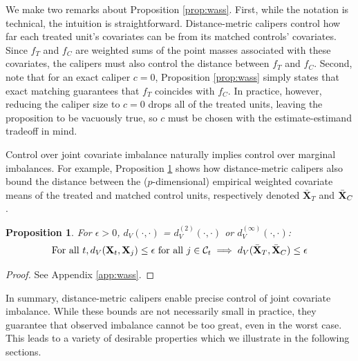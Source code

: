 \documentclass{article}
\newtheorem{proposition}[theorem]{Proposition}
\newcommand{\bX}{\mathbf{X}}
\newcommand{\Xt}{\mathbf{X}_t}
\newcommand{\Xj}{\mathbf{X}_j}
\newcommand{\Ct}{\mathcal{C}_{t}}
\begin{document}
We make two remarks about Proposition \ref{prop:wass}.
First, while the notation is technical, the intuition is straightforward.
Distance-metric calipers control how far each treated unit's covariates can be from its matched controls' covariates.
Since $f_T$ and $f_C$ are weighted sums of the point masses associated with these covariates, the calipers must also control the distance between $f_T$ and $f_C$.
Second, note that for an exact caliper $c=0$, Proposition \ref{prop:wass} simply states that exact matching guarantees that $f_T$ coincides with $f_C$.
In practice, however, reducing the caliper size to $c=0$ drops all of the treated units, leaving the proposition to be vacuously true, so $c$ must be chosen with the estimate-estimand tradeoff in mind.

Control over joint covariate imbalance naturally implies control over marginal imbalances.
For example, Proposition \ref{prop:meanbd} shows how distance-metric calipers also bound the distance between the ($p$-dimensional) empirical weighted covariate means of the treated and matched control units, respectively denoted $\bar{\bX}_T$ and $\Bar{\bX}_C$.
\begin{proposition}
\label{prop:meanbd}
    For $\epsilon > 0$, $d_V(\cdot, \cdot)$ = $d^{(2)}_V(\cdot, \cdot)$ or $d^{(\infty)}_V(\cdot, \cdot)$:
    \begin{align*}
        \text{For all } t, d_V(\Xt, \Xj) \leq \epsilon \text{ for all } j \in \Ct
        \implies d_V(\bar{\bX}_T, \Bar{\bX}_C) \leq \epsilon
    \end{align*}
\end{proposition}
\begin{proof}
    See Appendix \ref{app:wass}.
\end{proof}

In summary, distance-metric calipers enable precise control of joint covariate imbalance.
While these bounds are not necessarily small in practice, they guarantee that observed imbalance cannot be too great, even in the worst case.
This leads to a variety of desirable properties which we illustrate in the following sections.
\end{document}
